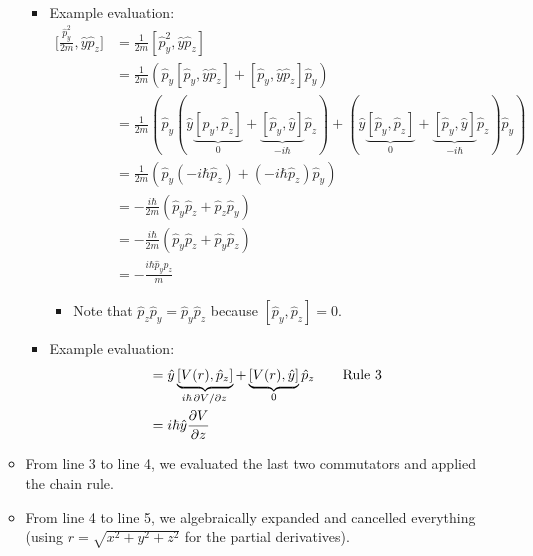 \documentclass[../notes.tex]{subfiles}
\begin{document}
\begin{itemize}
\begin{itemize}
\begin{itemize}
\begin{align*}
            \end{align*}
            \item Example evaluation:
            \begin{align*}
                \Bigg[ \frac{\hat{p}_y^2}{2m},\hat{y}\hat{p}_z \Bigg] &= \frac{1}{2m}[\hat{p}_y^2,\hat{y}\hat{p}_z]\tag*{Rule 4}\\
                &= \frac{1}{2m}(\hat{p}_y[\hat{p}_y,\hat{y}\hat{p}_z]+[\hat{p}_y,\hat{y}\hat{p}_z]\hat{p}_y)\tag*{Rule 1}\\
                &= \frac{1}{2m}(\hat{p}_y(\hat{y}\underbrace{[\hat{p}_y,\hat{p}_z]}_0+\underbrace{[\hat{p}_y,\hat{y}]}_{-i\hbar}\hat{p}_z)+(\hat{y}\underbrace{[\hat{p}_y,\hat{p}_z]}_0+\underbrace{[\hat{p}_y,\hat{y}]}_{-i\hbar}\hat{p}_z)\hat{p}_y)\tag*{Rule 3}\\
                &= \frac{1}{2m}(\hat{p}_y(-i\hbar\hat{p}_z)+(-i\hbar\hat{p}_z)\hat{p}_y)\\
                &= -\frac{i\hbar}{2m}(\hat{p}_y\hat{p}_z+\hat{p}_z\hat{p}_y)\\
                &= -\frac{i\hbar}{2m}(\hat{p}_y\hat{p}_z+\hat{p}_y\hat{p}_z)\\
                &= -\frac{i\hbar\hat{p}_y\hat{p}_z}{m}
            \end{align*}
            \begin{itemize}
                \item Note that $\hat{p}_z\hat{p}_y=\hat{p}_y\hat{p}_z$ because $[\hat{p}_y,\hat{p}_z]=0$.
            \end{itemize}
            \item Example evaluation:
            \begin{align*}
                [V(r),\hat{y}\hat{p}_z] &= \hat{y}\underbrace{[V(r),\hat{p}_z]}_{i\hbar\pdv*{V}{z}}+\underbrace{[V(r),\hat{y}]}_0\hat{p}_z\tag*{Rule 3}\\
                &= i\hbar\hat{y}\pdv{V}{z}
            \end{align*}
        \end{itemize}
        \item From line 3 to line 4, we evaluated the last two commutators and applied the chain rule.
        \item From line 4 to line 5, we algebraically expanded and cancelled everything (using $r=\sqrt{x^2+y^2+z^2}$ for the partial derivatives).

\end{itemize}
\end{itemize}
\end{document}
